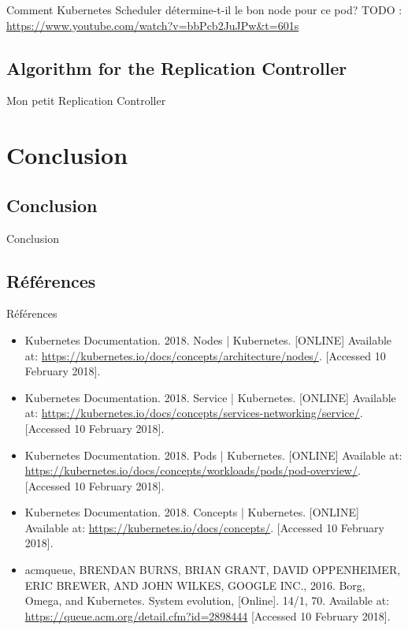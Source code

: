 \documentclass{bredelebeamer}
\begin{document}
\begin{frame}{Comment Kubernetes Scheduler détermine-t-il le bon node pour ce pod?}
TODO : \url{https://www.youtube.com/watch?v=bbPcb2JuJPw&t=601s}
\end{frame}

\subsection{Algorithm for the Replication Controller}
\begin{frame}{Mon petit Replication Controller}

\end{frame}


\section{Conclusion}
\subsection{Conclusion}
\begin{frame}{Conclusion}

\end{frame}

\subsection{Références}


\begin{frame}{Références}
\begin{itemize}
\item Kubernetes Documentation. 2018. Nodes | Kubernetes. [ONLINE] Available at: \url{https://kubernetes.io/docs/concepts/architecture/nodes/}. [Accessed 10 February 2018].
\item Kubernetes Documentation. 2018. Service | Kubernetes. [ONLINE] Available at: \url{https://kubernetes.io/docs/concepts/services-networking/service/}. [Accessed 10 February 2018].
\item Kubernetes Documentation. 2018. Pods | Kubernetes. [ONLINE] Available at: \url{https://kubernetes.io/docs/concepts/workloads/pods/pod-overview/}. [Accessed 10 February 2018].
\item Kubernetes Documentation. 2018. Concepts | Kubernetes. [ONLINE] Available at: \url{https://kubernetes.io/docs/concepts/}. [Accessed 10 February 2018].
\item acmqueue, BRENDAN BURNS, BRIAN GRANT, DAVID OPPENHEIMER, ERIC BREWER, AND JOHN WILKES, GOOGLE INC., 2016. Borg, Omega, and Kubernetes. System evolution, [Online]. 14/1, 70. Available at: \url{https://queue.acm.org/detail.cfm?id=2898444} [Accessed 10 February 2018].
\end{itemize}
\end{frame}
\end{document}
